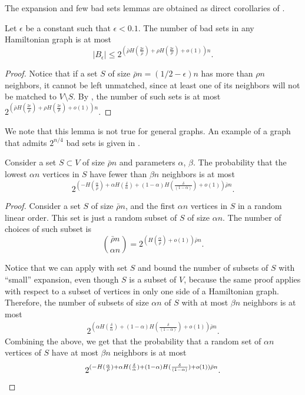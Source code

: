 \documentclass{toc}
\theoremstyle{plain}
\begin{document}
The expansion and few bad sets lemmas are obtained as direct corollaries of .

%
\begin{lemma}
	Let $\epsilon$ be a constant such that $\epsilon<0.1$. The number of bad sets in any Hamiltonian graph is at most
	$$|B_\epsilon|\leq  2^{\left(\bar{\rho} H(\frac{2\epsilon}{\bar{\rho}})+\rho H(\frac{2\epsilon} {\rho})+o(1)\right)n}.$$ \label{lem:ham_bad_sets}
\end{lemma}
\begin{proof}
	Notice that if a set $S$ of size 
%
$\bar{\rho} n = (1/2-\epsilon)n$   %
has more than $\rho n$ neighbors, it cannot be left unmatched, since at least one of its neighbors will not be matched to $V\setminus S$. 
%
%
%
%
By , the number of such sets is at most $2^{\left(\bar{\rho} H(\frac{2\epsilon}{\bar{\rho}})+\rho H(\frac{2\epsilon} {\rho})+o(1)\right)n}.$
\end{proof}

We note that this lemma is not true for general graphs.
An example of a graph that admits $2^{n/4}$ bad sets is given in .

\begin{lemma}
	Consider a set $S\subset V$ of size $\bar{\rho} n$ and parameters $\alpha$, $\beta$. The probability that the lowest $\alpha n$ vertices in $S$ have
%
fewer  %
than $\beta n$ neighbors is at most
	$$2^{\left(-H(\frac{\alpha}{\bar{\rho}})+\alpha H(\frac{\delta}{ \alpha})+(1-\alpha)H(\frac{\delta} {(1-\alpha)})+o(1)\right)\bar{\rho}n}.$$   \label{lem:ham_expansion}	
\end{lemma}
\begin{proof}
	Consider a set $S$ of size $\bar{\rho} n$, and the first $\alpha n$ vertices in $S$ in a random linear order. This set is just a random subset of $S$ of size $\alpha n$. The number of choices of such subset is $$\binom{\bar{\rho}n}{\alpha n} = 2^{(H(\frac{\alpha}{\bar{\rho}})+o(1))\bar{\rho} n}.$$

Notice that we can apply  
 with set $S$ and bound the number of subsets of $S$ with ``small'' expansion, 
%
%
%
%
even though $S$ is a subset of $V$, because the same proof applies
%
%
with respect to a subset of vertices in only %
one side of a Hamiltonian graph. Therefore, the number of subsets of size $\alpha n$ of $S$ with at most $\beta n$ neighbors is at most
	\begin{eqnarray*}
		2^{(\alpha H(\frac{\delta}{ \alpha})+(1-\alpha)H(\frac{\delta} {(1-\alpha)})+o(1))\bar{\rho}n}.
	\end{eqnarray*}
	Combining the above, we get that the probability that a random set of $\alpha n$ vertices of $S$ have at most $\beta n$ neighbors is at most
	\begin{eqnarray*}
2^{(-H(\frac{\alpha}{\bar{\rho}})+\alpha H(\frac{\delta}{ \alpha})+(1-\alpha)H(\frac{\delta} {(1-\alpha)})+o(1))\bar{\rho}n}.     \qedhere
	\end{eqnarray*}          
\end{proof}
\end{document}
